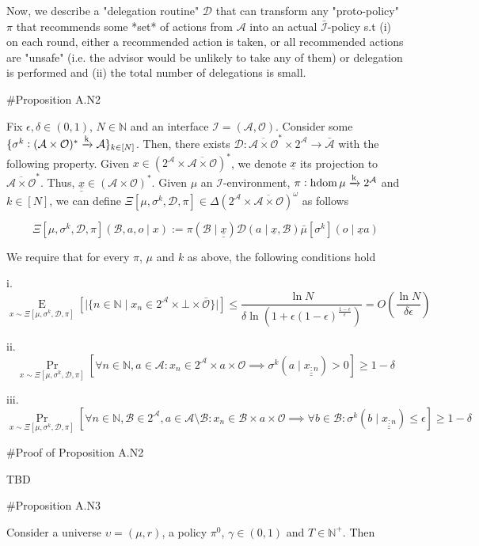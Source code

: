 \documentclass[a4paper]{article}
\newcommand{\E}[1]{\underset{#1}{\operatorname{E}}}
\newcommand{\Nats}{\mathbb{N}}
\newcommand{\Abs}[1]{\lvert #1 \rvert}
\newcommand{\M}{\xrightarrow{\textnormal{k}}}
\newcommand{\Ob}{\mathcal{O}}
\newcommand{\A}{\mathcal{A}}
\newcommand{\In}{\mathcal{I}}
\newcommand{\FH}{(\A \times \Ob)^*}
\newcommand{\Ada}{\bar{\A}}
\newcommand{\Adi}{{\bar{\In}}}
\newcommand{\Adao}{\overline{\A \times \Ob}}
\newcommand{\Adfh}{\Adao^*}
\DeclareMathOperator{\HD}{hdom}
\newcommand{\D}{\mathcal{D}}
\newcommand{\B}{\mathcal{B}}
\begin{document}
Now, we describe a "delegation routine" $\D$ that can transform any "proto-policy" $\pi$ that recommends some *set* of actions from $\A$ into an actual $\Adi$-policy s.t (i) on each round, either a recommended action is taken, or all recommended actions are "unsafe" (i.e. the advisor would be unlikely to take any of them) or delegation is performed and (ii) the total number of delegations is small.

\#Proposition A.N2

Fix $\epsilon,\delta \in (0,1)$, $N \in \Nats$ and an interface $\In=(\A,\Ob)$. Consider some $\{\sigma^k: \FH \M \A\}_{k \in [N]}$. Then, there exists $\D: \Adfh \times 2^\A \rightarrow \Ada$ with the following property. Given $x \in \left(2^\A \times \Adao\right)^*$, we denote $\underline{x}$ its projection to $\Adfh$. Thus, $\underline{\underline{x}}\in\FH$.
Given  $\mu$ an $\In$-environment, $\pi: \HD{\mu} \M 2^\A$ and $k \in [N]$, we can define $\Xi\left[\mu,\sigma^k,\D,\pi\right]\in \Delta\left(2^\A \times \Adao\right)^\omega$ as follows
 
$$\Xi\left[\mu,\sigma^k,\D,\pi\right]\left(\B,a,o \mid x\right):=\pi\left(\B \mid \underline{\underline{x}}\right)\D\left(a \mid \underline{x},\B\right) \bar{\mu}[\sigma^k]\left(o \mid \underline{x}a\right)$$

We require that for every $\pi$, $\mu$ and $k$ as above, the following conditions hold

i. $$\E{x \sim\Xi\left[\mu,\sigma^k,\D,\pi\right]}\left[\Abs{\{n \in \Nats \mid x_n \in 2^\A \times \bot \times \bar{\Ob}\}}\right] \leq \frac{\ln N}{\delta \ln\left(1 + \epsilon(1-\epsilon)^{\frac{1-\epsilon}{\epsilon}}\right)}=O\left(\frac{\ln N}{\delta \epsilon}\right)$$

ii. $$\Pr_{x \sim \Xi\left[\mu,\sigma^k,\D,\pi\right]}\left[\forall n \in \Nats, a \in \A: x_n \in 2^\A \times a \times \Ob \implies \sigma^k\left(a \mid \underline{\underline{x_{:n}}}\right) > 0\right] \geq 1 - \delta$$

iii.  $$\Pr_{x \sim \Xi\left[\mu,\sigma^k,\D,\pi\right]}\left[\forall n \in \Nats, \B \in 2^\A, a \in \A \setminus \B: x_n \in \B \times a \times \Ob \implies \forall b \in \B: \sigma^k\left(b \mid \underline{\underline{x_{:n}}}\right) \leq \epsilon\right] \geq 1 - \delta$$

\#Proof of Proposition A.N2

TBD

\#Proposition A.N3

Consider a universe $\upsilon=(\mu,r)$, a policy $\pi^0$, $\gamma\in(0,1)$ and $T \in \Nats^+$. Then
\end{document}
